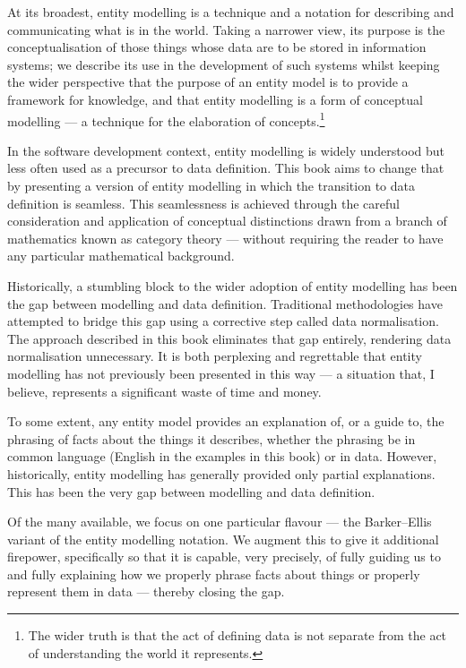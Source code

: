 \begin{newtt}
At its broadest, entity modelling is a technique and a notation for describing and communicating what is in the world. Taking a narrower view, its purpose is the conceptualisation of those things whose data are to be stored in information systems; we describe its use in the development of such systems whilst keeping the wider perspective that the purpose of an entity model is to provide a framework for knowledge, and that entity modelling is a form of conceptual modelling — a technique for the elaboration of concepts.\footnote{The wider truth is that the act of defining data is not separate from the act of understanding the world it represents.}

In the software development context, entity modelling is widely understood but less often used as a precursor to data definition. This book aims to change that by presenting a version of entity modelling in which the transition to data definition is seamless. This seamlessness is achieved through the careful consideration and application of conceptual distinctions drawn from a branch of mathematics known as category theory — without requiring the reader to have any particular mathematical background.

Historically, a stumbling block to the wider adoption of entity modelling has been the gap between modelling and data definition. Traditional methodologies have attempted to bridge this gap using a corrective step called data normalisation. The approach described in this book eliminates that gap entirely, rendering data normalisation unnecessary. It is both perplexing and regrettable that entity modelling has not previously been presented in this way — a situation that, I believe, represents a significant waste of time and money.

To some extent, any entity model provides an explanation of, or a guide to, the phrasing of facts about the things it describes, whether the phrasing be in common language (English in the examples in this book) or in data. However, historically, entity modelling has generally provided only partial explanations. This has been the very gap between modelling and data definition.

Of the many available, we focus on one particular flavour — the Barker–Ellis variant of the entity modelling notation. We augment this to give it additional firepower, specifically so that it is capable, very precisely, of fully guiding us to and fully explaining how we properly phrase facts about things or properly represent them in data — thereby closing the gap.
\end{newtt}



